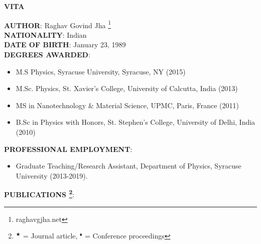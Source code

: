 \thispagestyle{empty}
\begin{center}
{\large {\bf VITA}}
\end{center}
\vspace{1cm}
{\bf AUTHOR}: Raghav Govind Jha \footnote{raghavgjha.net} \\
{\bf NATIONALITY}: Indian \\
{\bf DATE OF BIRTH}: January 23, 1989 \\
{\bf DEGREES AWARDED}:
\begin{itemize}
\item M.S Physics, Syracuse University, Syracuse, NY  (2015)
\item M.Sc. Physics, St. Xavier's College, University of Calcutta, India (2013) 
\item MS in Nanotechnology \& Material Science, UPMC, Paris, France (2011) 
\item B.Sc in Physics with Honors, St. Stephen's College, University of Delhi, India (2010) 
\end{itemize}
{\bf PROFESSIONAL EMPLOYMENT}:
\begin{itemize}
\item[] Graduate Teaching/Research Assistant, Department of Physics, Syracuse University (2013-2019).
\end{itemize}
{\bf PUBLICATIONS \footnote{$^{\bigstar}$ = Journal article, $^{\blacklozenge}$ = Conference proceedings}}:
